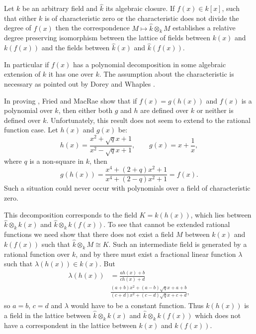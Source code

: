 \begin{proposition} \label{Base:Change:Prop}
Let $k$ be an arbitrary field and $\hat{k}$ its algebraic closure.  If
$f(x) \in k[x]$, such that either $k$ is of characteristic zero or the
characteristic does not divide the degree of $f(x)$ then the correspondence
$M \mapsto \hat{k}\otimes_k M$ establishes a relative degree preserving
isomorphism between the lattice of fields between $k(x)$ and $k(f(x))$ and
the fields between $\hat{k}(x)$ and $\hat{k}(f(x))$.
\end{proposition}

In particular if $f(x)$ has a polynomial decomposition in some
algebraic extension of $k$ it has one over $k$.  The assumption about
the characteristic is necessary as pointed out by Dorey and Whaples
\cite{Dorey74}.  

In proving , Fried and MacRae show that if
$f(x) = g(h(x))$ and $f(x)$ is a polynomial over $k$, then either both
$g$ and $h$ are defined over $k$ or neither is defined over $k$.
Unfortunately, this result does not seem to extend to the rational
function case.  Let $h(x)$ and $g(x)$ be:
\[
h(x) = \frac{x^2+\sqrt{q}x + 1}{x^2-\sqrt{q}x + 1}, \qquad
g(x) = x + \frac{1}{x},
\]
where $q$ is a non-square in $k$, then
\[
g(h(x)) = \frac{x^4 + (2 + q) x^2 + 1}{x^4 + (2 - q) x^2 + 1}
  = f(x).
\]
Such a situation could never occur with polynomials over a field of
characteristic zero.  

This decomposition corresponds to the field $K = k(h(x))$, which lies
between $\hat{k} \otimes_k k(x)$ and $\hat{k} \otimes_k k(f(x))$.  To
see that  cannot be extended rational
functions we need show that there does not exist a field $M$ between
$k(x)$ and $k(f(x))$ such that $\hat{k} \otimes_k M\cong K$.  Such an
intermediate field is generated by a rational function over $k$, and
by  there must exist a fractional
linear function $\lambda$ such that $\lambda(h(x)) \in k(x)$.  But
\[
\begin{aligned}
\lambda(h(x)) & = \frac{a h(x) + b}{c h(x) + d}\\
  & \frac{(a+b)x^2+(a-b)\sqrt{q}x+a+b}{(c+d)x^2+(c-d)\sqrt{q}x+c+d},
\end{aligned}
\]
so $a= b$, $c = d$ and $\lambda$ would have to be a constant function.
Thus $k(h(x))$ is a field in the lattice between $\hat{k}\otimes_k
k(x)$ and $\hat{k}\otimes_k k(f(x))$ which does not have a
correspondent in the lattice between $k(x)$ and $k(f(x))$.

